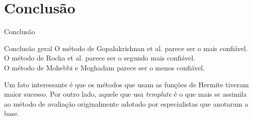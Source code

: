 
\section{Conclusão}

\begin{frame}{Conclusão}
    \begin{block}{\alert{Conclusão geral}}
        O método de Gopalakrishnan et al. parece ser o mais confiável.\\
        O método de Rocha et al. parece ser o segundo mais confiável.\\
        O método de Mohebbi e Moghadam parece ser o menos confiável.
    \end{block}
    \vskip20pt
    Um fato interessante é que os métodos que usam as funções de Hermite tiveram maior sucesso.
    \vskip10pt
    Por outro lado, aquele que usa \emph{template} é o que mais se assimila ao método de avaliação originalmente adotado por especialistas que anotaram a base.
\end{frame}
